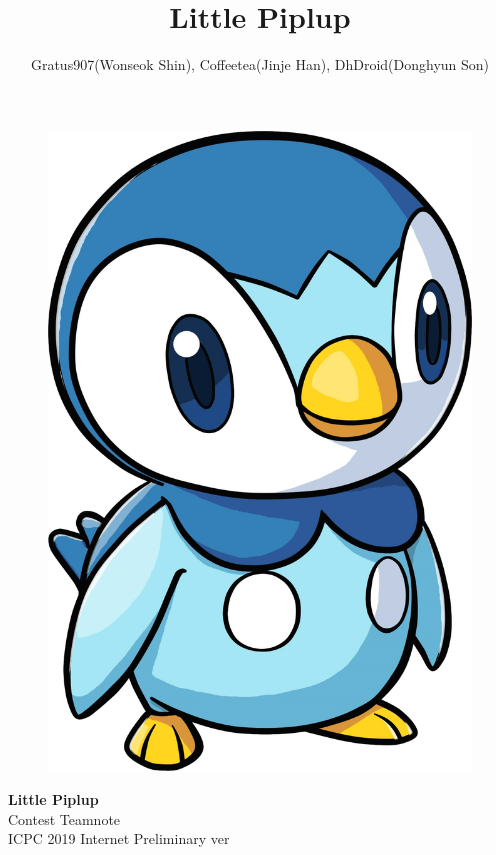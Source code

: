 \documentclass[landscape,8pt]{article}
\title{\Huge{\textsf{Little Piplup}}}
\author{Gratus907(Wonseok Shin), Coffeetea(Jinje Han), DhDroid(Donghyun Son)}
\date{ }
\begin{document}
{
  \setlength{\columnseprule}{0pt}
  \begin{multicols}{3}\raggedcolumns
  \vspace*{\fill}
  \begin{figure}[H]
  \includegraphics[width=\linewidth]{piplup}
  \end{figure}
  \vspace*{\fill}
  \columnbreak
  \begin{center}
  \vspace*{\fill}
  \huge{\textbf{Little Piplup}\\}
  \vspace{2em}
    \LARGE{Contest Teamnote \\}
   \large{ICPC 2019 Internet Preliminary ver}
  \vspace*{\fill}
  \end{center}
  \columnbreak


\end{multicols}}
\end{document}
